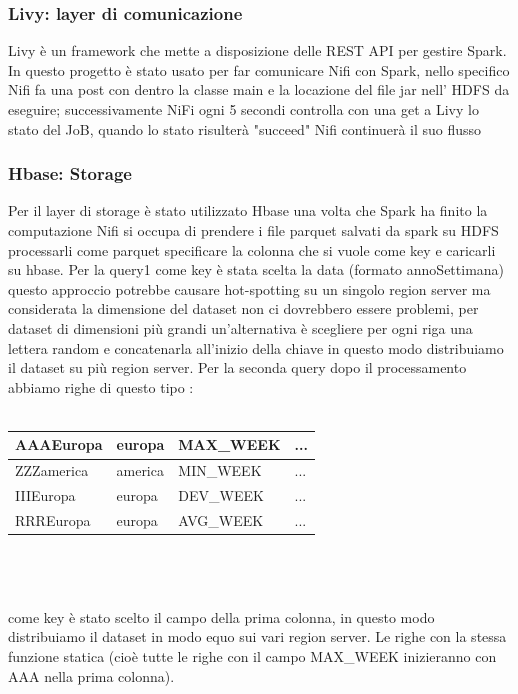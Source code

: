 \documentclass[acmsmall]{acmart}
\begin{document}
\subsubsection{Livy: layer di comunicazione}
Livy è un framework che mette a disposizione delle REST API per gestire Spark. In questo progetto è stato usato per far comunicare Nifi con Spark, nello specifico Nifi fa una post con dentro la classe main e la locazione del file jar nell' HDFS  da eseguire;
successivamente NiFi ogni 5 secondi controlla con una get a Livy lo stato del JoB, quando lo stato risulterà "succeed" Nifi continuerà il suo flusso 

\subsubsection{Hbase: Storage}
Per il layer di storage è stato utilizzato Hbase una volta che Spark ha finito la computazione Nifi si occupa di prendere i file parquet salvati 
da spark su HDFS processarli come parquet specificare la colonna che si vuole come key e caricarli su hbase.
Per la query1 come key è stata scelta la data (formato annoSettimana) questo approccio potrebbe causare hot-spotting su un singolo region server ma considerata la dimensione del dataset non ci dovrebbero essere problemi, per dataset di dimensioni più grandi un'alternativa è scegliere per ogni riga una lettera random e concatenarla all'inizio della chiave in questo modo distribuiamo il dataset su più region server. Per la seconda query dopo il processamento abbiamo righe di questo tipo :
\\
\\
\hspace{40mm}\begin{tabular}{|l|l|l|l|}
	\hline
	AAAEuropa  & europa  & MAX\_WEEK & ... \\ \hline
	ZZZamerica & america & MIN\_WEEK & ... \\ \hline
	IIIEuropa  & europa  & DEV\_WEEK & ... \\ \hline
	RRREuropa  & europa  & AVG\_WEEK & ... \\ \hline
\end{tabular}
\\
\\
\\

 come key è stato scelto il campo della prima colonna, in questo modo distribuiamo il dataset in modo equo sui vari region server. Le righe con la stessa funzione statica (cioè tutte le righe con il campo MAX\_WEEK inizieranno con AAA nella prima colonna).
\end{document}
